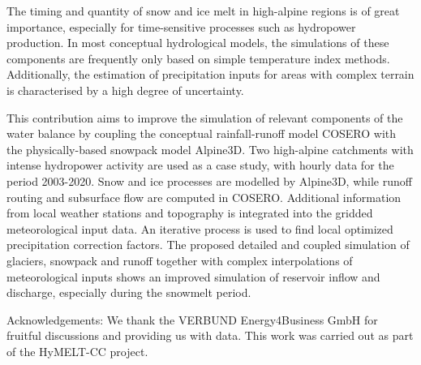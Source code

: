 The timing and quantity of snow and ice melt in high-alpine regions is of great importance, especially for time-sensitive processes such as hydropower production. In most conceptual hydrological models, the simulations of these components are frequently only based on simple temperature index methods. Additionally, the estimation of precipitation inputs for areas with complex terrain is characterised by a high degree of uncertainty.

This contribution aims to improve the simulation of relevant components of the water balance by coupling the conceptual rainfall-runoff model COSERO with the physically-based snowpack model Alpine3D. Two high-alpine catchments with intense hydropower activity are used as a case study, with hourly data for the period 2003-2020. Snow and ice processes are modelled by Alpine3D, while runoff routing and subsurface flow are computed in COSERO. Additional information from local weather stations and topography is integrated into the gridded meteorological input data. An iterative process is used to find local optimized precipitation correction factors. The proposed detailed and coupled simulation of glaciers, snowpack and runoff together with complex interpolations of meteorological inputs shows an improved simulation of reservoir inflow and discharge, especially during the snowmelt period.

Acknowledgements: We thank the VERBUND Energy4Business GmbH for fruitful discussions and providing us with data. This work was carried out as part of the HyMELT-CC project.
\newpage{}
{}
\begin{flushleft}








\end{flushleft}

